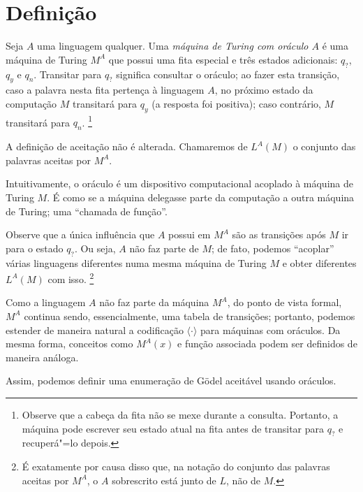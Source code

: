 \section{Definição}
\label{sec:oracle_definition}

\begin{definition}
    Seja $A$ uma linguagem qualquer.
    Uma \emph{máquina de Turing com oráculo $A$}
    é uma máquina de Turing $M^A$ que possui uma fita especial
    e três estados adicionais: $q_?$, $q_y$ e $q_n$.
    Transitar para $q_?$ significa consultar o oráculo;
    ao fazer esta transição,
    caso a palavra nesta fita pertença à linguagem $A$,
    no próximo estado da computação $M$ transitará para $q_y$
    (a resposta foi positiva);
    caso contrário, $M$ transitará para $q_n$.%
    \footnote{
        Observe que a cabeça da fita não se mexe durante a consulta.
        Portanto, a máquina pode escrever seu estado atual na fita
        antes de transitar para $q_?$ e recuperá"=lo depois.
    }

    A definição de aceitação não é alterada.
    Chamaremos de $L^A(M)$ o conjunto das palavras aceitas por $M^A$.
\end{definition}

Intuitivamente, o oráculo é um dispositivo computacional
acoplado à máquina de Turing $M$.
É como se a máquina delegasse parte da computação
a outra máquina de Turing;
uma ``chamada de função''.

Observe que a única influência que $A$ possui em $M^A$
são as transições após $M$ ir para o estado $q_?$.
Ou seja, $A$ não faz parte de $M$;
de fato, podemos ``acoplar'' várias linguagens diferentes
numa mesma máquina de Turing $M$
e obter diferentes $L^A(M)$ com isso.%
\footnote{
    É exatamente por causa disso que,
    na notação do conjunto das palavras aceitas por $M^A$,
    o $A$ sobrescrito está junto de $L$, não de $M$.
}

Como a linguagem $A$ não faz parte da máquina $M^A$,
do ponto de vista formal,
$M^A$ continua sendo, essencialmente,
uma tabela de transições;
portanto,
podemos estender de maneira natural a codificação $\langle \cdot \rangle$
para máquinas com oráculos.
Da mesma forma, conceitos como $M^A(x)$ e função associada
podem ser definidos de maneira análoga.

Assim,
podemos definir uma enumeração de Gödel aceitável usando oráculos.

